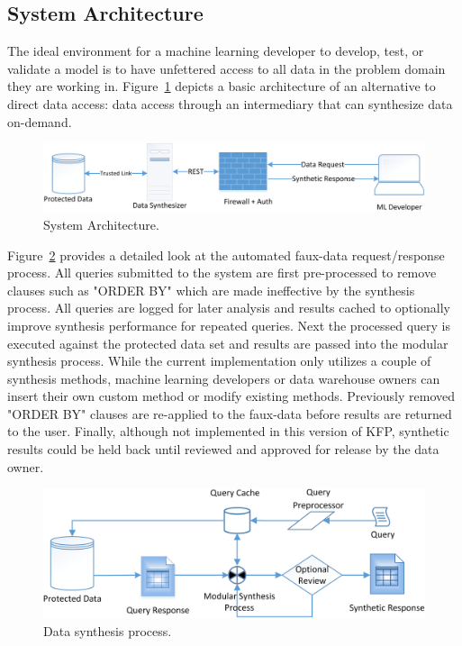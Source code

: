 \documentclass{article}
\begin{document}
\subsection{System Architecture}

The ideal environment for a machine learning developer to develop, test, or validate a model is to have unfettered access to all data in the problem domain they are working in. Figure~\ref{fig:architecture} depicts a basic architecture of an alternative to direct data access: data access through an intermediary that can synthesize data on-demand.

\begin{figure}[ht]
  \centering
  \includegraphics[width=\textwidth]{prototype_architecture}
  \caption{System Architecture.}
  \label{fig:architecture}
\end{figure}

Figure~\ref{fig:synthesis_process} provides a detailed look at the automated faux-data request/response process. All queries submitted to the system are first pre-processed to remove clauses such as "ORDER BY" which are made ineffective by the synthesis process. All queries are logged for later analysis and results cached to optionally improve synthesis performance for repeated queries. Next the processed query is executed against the protected data set and results are passed into the modular synthesis process. While the current implementation only utilizes a couple of synthesis methods, machine learning developers or data warehouse owners can insert their own custom method or modify existing methods. Previously removed "ORDER BY" clauses are re-applied to the faux-data before results are returned to the user. Finally, although not implemented in this version of KFP, synthetic results could be held back until reviewed and approved for release by the data owner.

\begin{figure}[ht]
  \centering
  \includegraphics[width=120mm]{data_synthesis_process}
  \caption{Data synthesis process.}
  \label{fig:synthesis_process}
\end{figure}
\end{document}
